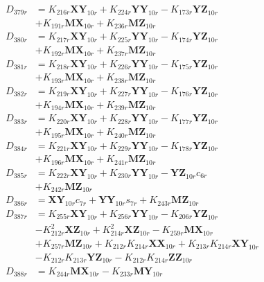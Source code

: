 \begin{align}
D_{379r} &= K_{216r}\mathbf{XY}_{10r} + K_{224r}\mathbf{YY}_{10r} - K_{173r}\mathbf{YZ}_{10r}  \nonumber \\
&+ K_{191r}\mathbf{MX}_{10r} + K_{236r}\mathbf{MZ}_{10r} \nonumber \\
D_{380r} &= K_{217r}\mathbf{XY}_{10r} + K_{225r}\mathbf{YY}_{10r} - K_{174r}\mathbf{YZ}_{10r}  \nonumber \\
&+ K_{192r}\mathbf{MX}_{10r} + K_{237r}\mathbf{MZ}_{10r} \nonumber \\
D_{381r} &= K_{218r}\mathbf{XY}_{10r} + K_{226r}\mathbf{YY}_{10r} - K_{175r}\mathbf{YZ}_{10r}  \nonumber \\
&+ K_{193r}\mathbf{MX}_{10r} + K_{238r}\mathbf{MZ}_{10r} \nonumber \\
D_{382r} &= K_{219r}\mathbf{XY}_{10r} + K_{227r}\mathbf{YY}_{10r} - K_{176r}\mathbf{YZ}_{10r}  \nonumber \\
&+ K_{194r}\mathbf{MX}_{10r} + K_{239r}\mathbf{MZ}_{10r} \nonumber \\
D_{383r} &= K_{220r}\mathbf{XY}_{10r} + K_{228r}\mathbf{YY}_{10r} - K_{177r}\mathbf{YZ}_{10r}  \nonumber \\
&+ K_{195r}\mathbf{MX}_{10r} + K_{240r}\mathbf{MZ}_{10r} \nonumber \\
D_{384r} &= K_{221r}\mathbf{XY}_{10r} + K_{229r}\mathbf{YY}_{10r} - K_{178r}\mathbf{YZ}_{10r}  \nonumber \\
&+ K_{196r}\mathbf{MX}_{10r} + K_{241r}\mathbf{MZ}_{10r} \nonumber \\
D_{385r} &= K_{222r}\mathbf{XY}_{10r} + K_{230r}\mathbf{YY}_{10r} - \mathbf{YZ}_{10r}c_{6r}  \nonumber \\
&+ K_{242r}\mathbf{MZ}_{10r} \nonumber \\
D_{386r} &= \mathbf{XY}_{10r}c_{7r} + \mathbf{YY}_{10r}s_{7r} + K_{243r}\mathbf{MZ}_{10r} \nonumber \\
D_{387r} &= K_{255r}\mathbf{XY}_{10r} + K_{256r}\mathbf{YY}_{10r} - K_{206r}\mathbf{YZ}_{10r}  \nonumber \\
&- K_{212r}^2\mathbf{XZ}_{10r} + K_{214r}^2\mathbf{XZ}_{10r} - K_{259r}\mathbf{MX}_{10r}  \nonumber \\
&+ K_{257r}\mathbf{MZ}_{10r} + K_{212r}K_{214r}\mathbf{XX}_{10r} + K_{213r}K_{214r}\mathbf{XY}_{10r}  \nonumber \\
&- K_{212r}K_{213r}\mathbf{YZ}_{10r} - K_{212r}K_{214r}\mathbf{ZZ}_{10r} \nonumber \\
D_{388r} &= K_{244r}\mathbf{MX}_{10r} - K_{233r}\mathbf{MY}_{10r} \nonumber \\

\end{align}
